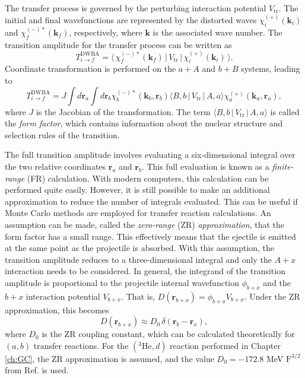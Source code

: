 The transfer process is governed by the perturbing interaction potential $V_{\mathrm{tr}}$. The initial and final wavefunctions are represented by the distorted waves $\chi^{(+)}_{i}(\boldsymbol{k}_{i})$ and $\chi^{(-)*}_{f}(\boldsymbol{k}_{f})$, respectively, where $\boldsymbol{k}$ is the associated wave number. The transition amplitude for the transfer process can be written as
\begin{equation}
T^{\mathrm{DWBA}}_{i \rightarrow f} = \langle \, \chi^{(-)*}_{f}(\boldsymbol{k}_{f})\, | \, V_{\mathrm{tr}} \, | \, \chi^{(+)}_{i}(\boldsymbol{k}_{i}) \, \rangle.
\end{equation}
Coordinate transformation is performed on the $a+A$ and $b+B$ systems, leading to
\begin{equation}
T^{\mathrm{DWBA}}_{i \rightarrow f} = J \int d\boldsymbol{r}_{a} \int d\boldsymbol{r}_{b} \chi^{(-)*}_{b}(\boldsymbol{k}_{b},\boldsymbol{r}_{b})\langle B,b \, | \,  V_{\mathrm{tr}} \, | \, A,a \rangle \chi^{(+)}_{a}(\boldsymbol{k}_{a},\boldsymbol{r}_{a}),
\end{equation}
where $J$ is the Jacobian of the transformation. The term $\langle B,b \, | \, V_{\mathrm{tr}} \, | \, A,a \rangle$ is called the \emph{form factor}, which contains information about the nuclear structure and selection rules of the transition. 

The full transition amplitude involves evaluating a six-dimensional integral over the two relative coordinates $\boldsymbol{r}_{a}$ and $\boldsymbol{r}_{b}$. This full evaluation is known as a \emph{finite-range} (FR) calculation. With modern computers, this calculation can be performed quite easily. However, it is still possible to make an additional approximation to reduce the number of integrals evaluated. This can be useful if Monte Carlo methods are employed for transfer reaction calculations. An assumption can be made, called the \emph{zero-range} (ZR) \emph{approximation}, that the form factor has a small range. This effectively means that the ejectile is emitted at the same point as the projectile is absorbed. With this assumption, the transition amplitude reduces to a three-dimensional integral and only the $A+x$ interaction needs to be considered. In general, the integrand of the transition amplitude is proportional to the projectile internal wavefunction $\phi_{b+x}$ and the $b+x$ interaction potential $V_{b+x}$. That is, $D(\boldsymbol{r}_{b+x}) = \phi_{b+x} V_{b+x}$. Under the ZR approximation, this becomes
\begin{equation}
D(\boldsymbol{r}_{b+x}) \approx D_{0} \, \delta(\boldsymbol{r}_{b} - \boldsymbol{r}_{x}),
\end{equation}
where $D_{0}$ is the ZR coupling constant, which can be calculated theoretically for $(a,b)$ transfer reactions. For the $(^{3}\mathrm{He},d)$ reaction performed in Chapter \ref{ch:GC}, the ZR approximation is assumed, and the value $D_{0} = -172.8$ MeV $\mathrm{F}^{3/2}$ from Ref. \cite{Bassel1966} is used.

